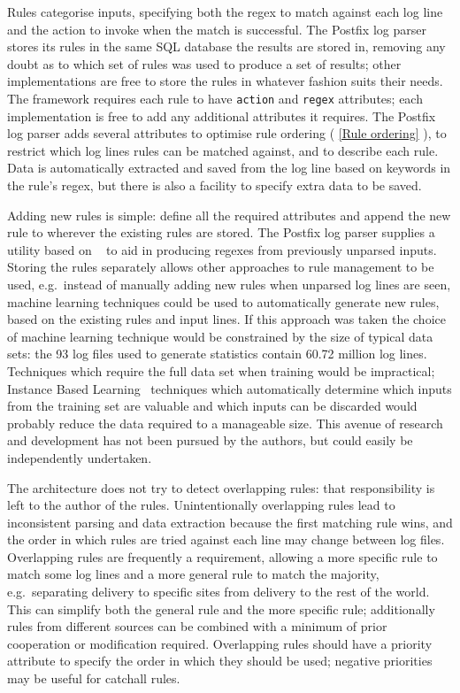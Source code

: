 \documentclass[draft]{svmult}
\newcommand{\sectionref}[1]{%
    \textsection{}\vref*{#1}%
}
\newcommand{\numberOFlogFILES}[0]{%
    93%
}
\newcommand{\numberOFlogLINEShuman}[0]{%
    60.72 million%
}
\begin{document}
Rules categorise inputs, specifying both the regex to match against each
log line and the action to invoke when the match is successful.  The
Postfix log parser stores its rules in the same SQL database the results
are stored in, removing any doubt as to which set of rules was used to
produce a set of results; other implementations are free to store the rules
in whatever fashion suits their needs.  The framework requires each rule to
have \texttt{action} and \texttt{regex} attributes; each implementation is
free to add any additional attributes it requires.  The Postfix log parser
adds several attributes to optimise rule ordering (\sectionref{Rule
ordering}), to restrict which log lines rules can be matched against, and
to describe each rule.  Data is automatically extracted and saved from the
log line based on keywords in the rule's regex, but there is also a
facility to specify extra data to be saved.

Adding new rules is simple: define all the required attributes and append
the new rule to wherever the existing rules are stored.  The Postfix log
parser supplies a utility based on \SLCT{}~\cite{slct-paper} to aid in
producing regexes from previously unparsed inputs.  Storing the rules
separately allows other approaches to rule management to be used, e.g.\
instead of manually adding new rules when unparsed log lines are seen,
machine learning techniques could be used to automatically generate new
rules, based on the existing rules and input lines.  If this approach was
taken the choice of machine learning technique would be constrained by the
size of typical data sets: the \numberOFlogFILES{} log files used to
generate statistics contain \numberOFlogLINEShuman{} log lines.  Techniques
which require the full data set when training would be impractical;
Instance Based Learning~\cite{instance-based-learning} techniques which
automatically determine which inputs from the training set are valuable and
which inputs can be discarded would probably reduce the data required to a
manageable size.  This avenue of research and development has not been
pursued by the authors, but could easily be independently undertaken.

The architecture does not try to detect overlapping rules: that
responsibility is left to the author of the rules.  Unintentionally
overlapping rules lead to inconsistent parsing and data extraction because
the first matching rule wins, and the order in which rules are tried
against each line may change between log files.  Overlapping rules are
frequently a requirement, allowing a more specific rule to match some log
lines and a more general rule to match the majority, e.g.\ separating
\SMTP{} delivery to specific sites from \SMTP{} delivery to the rest of the
world.  This can simplify both the general rule and the more specific rule;
additionally rules from different sources can be combined with a minimum of
prior cooperation or modification required.  Overlapping rules should have
a priority attribute to specify the order in which they should be used;
negative priorities may be useful for catchall rules.
\end{document}
